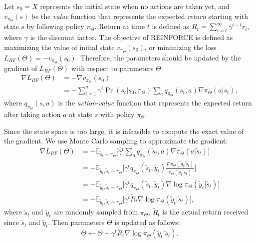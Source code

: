 \documentclass[letterpaper]{article} %
\begin{document}
	Let $s_0=X$ represents the initial state when no actions are taken yet, and $v_{\pi_{\Theta}}(s)$ be the \emph{value} function that represents the expected \emph{return} starting with state $s$ by following policy $\pi_{\Theta}$. Return at time $t$ is defined as $R_t=\sum_{i=t}^{\infty} \gamma^{i-t} r_i$, where $\gamma$ is the discount factor. The objective of REINFORCE is defined as maximizing the value of initial state $v_{\pi_{\Theta}}(s_0)$, or minimizing the loss $L_{RF}(\Theta) = - v_{\pi_{\Theta}}(s_0)$. Therefore, the parameters should be updated by the gradient of $L_{RF}(\Theta)$ with respect to parameters $\Theta$:
	\begin{align}
	\nabla L_{RF}(\Theta) &= - \nabla v_{\pi_{\Theta}}(s_0) \label{eq:L_RF} \\ 
	&=- \sum_{t=1}^{n} \gamma^t \Pr(s_t | s_0, \pi_{\Theta}) \sum_{a} q_{\pi_{\Theta}}(s_t,a) \nabla \pi_{\Theta}(a|s_t) ,
	\end{align} 
	where $q_{\pi_{\Theta}}(s,a)$ is the \emph{action-value} function that represents the expected return after taking action $a$ at state $s$ with policy $\pi_{\Theta}$. 
	
	Since the state space is too large, it is infeasible to compute the exact value of the gradient. We use Monte Carlo sampling to approximate the gradient:
	\begin{align}
	\nabla L_{RF}(\Theta) &= - \mathbb{E}_{\tilde{s}_t \sim \pi_{\Theta}} \Big[ \gamma^t \sum_{a} q_{\pi_{\Theta}}(\tilde{s}_t,a) \nabla \pi_{\Theta}(a|\tilde{s}_t) \Big] \\
	&= - \mathbb{E}_{\tilde{y}_t, \tilde{s}_t \sim \pi_{\Theta}} \Big[ \gamma^t q_{\pi_{\Theta}}(\tilde{s}_t,\tilde{y}_t) \frac{\nabla \pi_{\Theta}(\tilde{y}_t|\tilde{s}_t)}{\pi_{\Theta}(\tilde{y}_t|\tilde{s}_t)}  \Big] \\
	&= - \mathbb{E}_{\tilde{y}_t, \tilde{s}_t \sim \pi_{\Theta}} \Big[ \gamma^t q_{\pi_{\Theta}}(\tilde{s}_t,\tilde{y}_t) \nabla \log \pi_{\Theta}(\tilde{y}_t|\tilde{s}_t) \Big] \\
	&= - \mathbb{E}_{\tilde{y}_t, \tilde{s}_t \sim \pi_{\Theta}} \Big[ \gamma^t \tilde{R}_t \nabla \log \pi_{\Theta}(\tilde{y}_t|\tilde{s}_t) \Big] ,
	\end{align}
	where $\tilde{s}_t$ and $\tilde{y}_t$ are randomly sampled from $\pi_{\Theta}$, $\tilde{R}_t$ is the actual return received since $\tilde{s}_t$ and $\tilde{y}_t$. Then parameters $\Theta$ is updated as follows:
	\begin{equation} \label{eq:update}
	\Theta \leftarrow \Theta + \gamma^t \tilde{R}_t \nabla \log \pi_{\Theta}(\tilde{y}_t|\tilde{s}_t) .
	\end{equation} 
	
\end{document}
